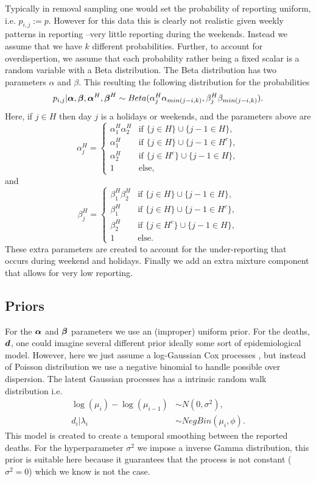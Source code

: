 Typically in removal sampling one would set the probability of reporting uniform, i.e. $p_{i,j}:=p$. However for this data this is clearly not realistic given weekly patterns in reporting --very little reporting during the weekends. Instead we assume that we have $k$ different probabilities. Further, to account for overdispertion, we assume that each probability rather being a fixed scalar is a random variable with a Beta distribution. The Beta distribution has two parameters $\alpha$ and $\beta$. This resulting the following distribution for the probabilities
$$
p_{i,j}| {\boldsymbol{\alpha}},{\boldsymbol{\beta}}, {\boldsymbol{\alpha}}^H,{\boldsymbol{\beta}}^H  \sim Beta(\alpha^H_j\alpha_{min(j-i,k)},\beta^H_j\beta_{min(j-i,k)}).
$$
Here, if $j\in H$ then day $j$ is a holidays or weekends, and the parameters above are
$$
\alpha^H_j = \begin{cases}
\alpha_1^H \alpha_2^H & \mbox{if }  \{j\in H \}\cup  \{j-1\in H \},  \\
\alpha_1^H & \mbox{if }  \{j\in H \}\cup  \{j-1\in H^c \}, \\
\alpha_2^H & \mbox{if }  \{j\in H^c \}\cup  \{j-1\in H \}, \\
1 & \mbox{else,}
\end{cases}
$$
and
$$
\beta^H_j = \begin{cases}
\beta_1^H \beta_2^H & \mbox{if }  \{j\in H \}\cup  \{j-1\in H \},  \\
\beta_1^H & \mbox{if }  \{j\in H \}\cup  \{j-1\in H^c \}, \\
\beta_2^H & \mbox{if }  \{j\in H^c \}\cup  \{j-1\in H \}, \\
1 & \mbox{else.}
\end{cases}
$$
These extra parameters are created to account for the under-reporting that occurs during weekend and holidays.
Finally we add an extra mixture component that allows for very low reporting.

\subsection{Priors}
For the ${\boldsymbol{\alpha}}$ and ${\boldsymbol{\beta}}$ parameters we use an (improper) uniform prior. For the deaths, ${\boldsymbol{d}}$, one could imagine several different prior ideally some sort of epidemiological model. However, here we just assume a log-Gaussian Cox processes \citep{Moller1998_log_gaussian}, but instead of Poisson distribution we use a negative binomial to handle possible over dispersion. The latent Gaussian processes has a intrinsic random walk distribution \citep{Rue2005_gaussian_markov} i.e.
\begin{align*}
\log(\mu_i) - \log(\mu_{i-1}) &\sim N(0,\sigma^2),\\
d_i| \lambda_i  &\sim NegBin(\mu_i, \phi).
\end{align*}
This model is created to create a temporal smoothing between the reported deaths.
For the hyperparameter $\sigma^2$ we impose a inverse Gamma distribution, this prior is suitable here because it guarantees that the process is not constant ($\sigma^2=0$) which we know is not the case.
